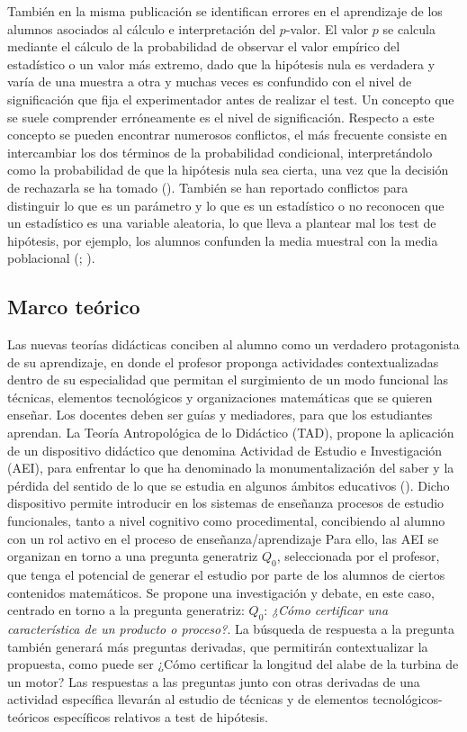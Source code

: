 \documentclass[oneside,spanish]{amsart}
\numberwithin{equation}{section}
\theoremstyle{definition}
\begin{document}
También en la misma publicación se identifican errores en el aprendizaje de los alumnos asociados al cálculo e interpretación del $p$-valor. El valor $p$ se calcula mediante el cálculo de la probabilidad de observar el valor empírico del estadístico o un valor más extremo, dado que la hipótesis nula es verdadera y varía de una muestra a otra y muchas veces es confundido con el nivel de significación que fija el experimentador antes de realizar el test.  Un concepto que se suele comprender erróneamente es el nivel de significación. Respecto a este concepto se pueden encontrar numerosos conflictos, el más frecuente consiste en intercambiar los dos términos de la probabilidad condicional, interpretándolo como la probabilidad de que la hipótesis nula sea cierta, una vez que la decisión de rechazarla se ha tomado (\citet{krauss02}). También se han reportado conflictos para distinguir lo que es un parámetro y lo que es un estadístico o no reconocen que un estadístico es una variable aleatoria, lo que lleva a plantear mal los test de hipótesis, por ejemplo, los alumnos confunden la media muestral con la media poblacional (\citet{korin21}; \citet{harradine11}).

\subsection{Marco teórico}

Las nuevas teorías didácticas conciben al alumno como un verdadero protagonista de su aprendizaje, en donde el profesor proponga actividades contextualizadas dentro de su especialidad que permitan el surgimiento de un modo funcional las técnicas, elementos tecnológicos y organizaciones matemáticas que se quieren enseñar. Los docentes deben ser guías y mediadores, para que los estudiantes aprendan. La Teoría Antropológica de lo Didáctico (TAD), propone la aplicación de un dispositivo didáctico que denomina Actividad de Estudio e Investigación (AEI), para enfrentar lo que ha denominado la monumentalización del saber y la pérdida del sentido de lo que se estudia en algunos ámbitos educativos (\citet{chevallard13}). Dicho dispositivo permite introducir en los sistemas de enseñanza procesos de estudio funcionales, tanto a nivel cognitivo como procedimental, concibiendo al alumno con un rol activo en el proceso de enseñanza/aprendizaje Para ello, las AEI se organizan en torno a una pregunta generatriz $Q_0$, seleccionada por el profesor, que tenga el potencial de generar el estudio por parte de los alumnos de ciertos contenidos matemáticos. Se propone una investigación y debate, en este caso, centrado en torno a la pregunta generatriz: $Q_0$: \textit{¿Cómo certificar una característica de un producto o proceso?}. La búsqueda de respuesta a la pregunta también generará más preguntas derivadas, que permitirán contextualizar la propuesta, como puede ser ¿Cómo certificar la longitud del alabe de la turbina de un motor? Las respuestas a las preguntas junto con otras derivadas de una actividad específica llevarán al estudio de técnicas y de elementos tecnológicos-teóricos específicos relativos a test de hipótesis.
\end{document}

